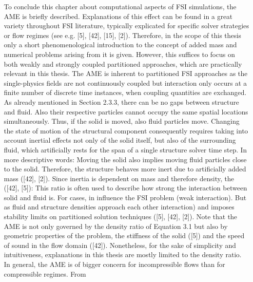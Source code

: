 To conclude this chapter about computational aspects of FSI simulations, the AME is briefly described.
Explanations of this effect can be found in a great variety throughout FSI literature, typically explicated
for specific solver strategies or flow regimes (see e.g. [5], [42], [15], [2]). Therefore, in the scope of
this thesis only a short phenomenological introduction to the concept of added mass and numerical
problems arising from it is given. However, this suffices to focus on both weakly and strongly coupled partitioned approaches, which are practically relevant in this thesis. The AME is inherent to partitioned
FSI approaches as the single-physics fields are not continuously coupled but interaction only occurs at a
finite number of discrete time instances, when coupling quantities are exchanged.
As already mentioned in Section 2.3.3, there can be no gaps between structure and fluid. Also their
respective particles cannot occupy the same spatial locations simultaneously. Thus, if the solid is moved,
also fluid particles move. Changing the state of motion of the structural component consequently requires
taking into account inertial effects not only of the solid itself, but also of the surrounding fluid, which
artificially rests for the span of a single structure solver time step. In more descriptive words: Moving the
solid also implies moving fluid particles close to the solid. Therefore, the structure behaves more inert
due to artificially added mass ([42], [2]). Since inertia is dependent on mass and therefore density, the
([42], [5]):
This ratio is often used to describe how strong the interaction between solid and fluid is. For cases, in
influence the FSI problem (weak interaction). But as fluid and structure densities approach each other
interaction) and imposes stability limits on partitioned solution techniques ([5], [42], [2]). Note that the
AME is not only governed by the density ratio of Equation 3.1 but also by geometric properties of the
problem, the stiffness of the solid ([5]) and the speed of sound in the flow domain ([42]). Nonetheless,
for the sake of simplicity and intuitiveness, explanations in this thesis are mostly limited to the density
ratio.
In general, the AME is of bigger concern for incompressible flows than for compressible regimes. From
